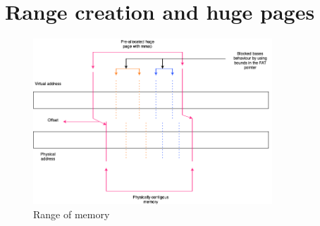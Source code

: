 

\section{Range creation and huge pages}
\begin{figure}[h]
  \includegraphics[width=0.8\textwidth]{diagrams/AllocationOverview24.png}
  \caption{Range of memory}
  \label{fig:RangeOfMemory}
\end{figure}


